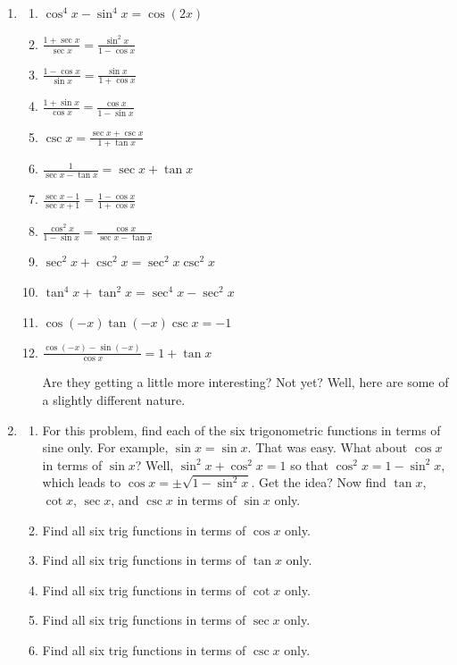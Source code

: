 \documentclass[english]{book}
\begin{document}
\begin{enumerate}
  \item \begin{enumerate}  %
    \item $\cos^{4} x - \sin^{4} x = \cos(2x)$
    \item $\frac{1 + \sec x}{\sec x} = \frac{\sin^{2} x}{1 - \cos x}$
    \item $\frac{1 - \cos x}{\sin x} = \frac{\sin x}{1 + \cos x}$
    \item $\frac{1 + \sin x}{\cos x} = \frac{\cos x}{1 - \sin x}$
    \item $\csc x = \frac{\sec x + \csc x}{1 + \tan x}$
    \item $\frac{1}{\sec x - \tan x} = \sec x + \tan x$
    \item $\frac{\sec x - 1}{\sec x + 1} = \frac{1 - \cos x}{1 + \cos x}$
    \item $\frac{\cos^{2} x}{1 - \sin x} = \frac{\cos x}{\sec x - \tan x}$
    \item $\sec^{2} x + \csc^{2} x = \sec^{2} x   \csc^{2} x$
    \item $\tan^{4} x + \tan^{2} x = \sec^{4} x - \sec^{2} x$
    \item $\cos(-x) \tan(-x) \csc x = -1$
    \item $\frac{ \cos(-x) - \sin(-x) }{\cos x} = 1 + \tan x$

          \vspace{0.3cm}
          
          Are they getting a little more interesting? Not yet? Well, here are some of a slightly different nature.
  \end{enumerate}

  \item \begin{enumerate}  %
    \item For this problem, find each of the six trigonometric functions in terms of sine only. For example, $\sin x = \sin x $. That was easy. What about $\cos x$ in terms of $\sin x$? Well, $\sin^{2} x + \cos^{2} x = 1$ so that $\cos^{2} x = 1 - \sin^{2} x$, which leads to $\cos x = \pm \sqrt{1 - \sin^{2} x}$. Get the idea? Now find $\tan x$, $\cot x$, $\sec x$, and $\csc x$ in terms of $\sin x$ only.
    \item Find all six trig functions in terms of $\cos x$ only.
    \item Find all six trig functions in terms of $\tan x$ only.
    \item Find all six trig functions in terms of $\cot x$ only.
    \item Find all six trig functions in terms of $\sec x$ only.
    \item Find all six trig functions in terms of $\csc x$ only.
  \end{enumerate}


\end{enumerate}
\end{document}
